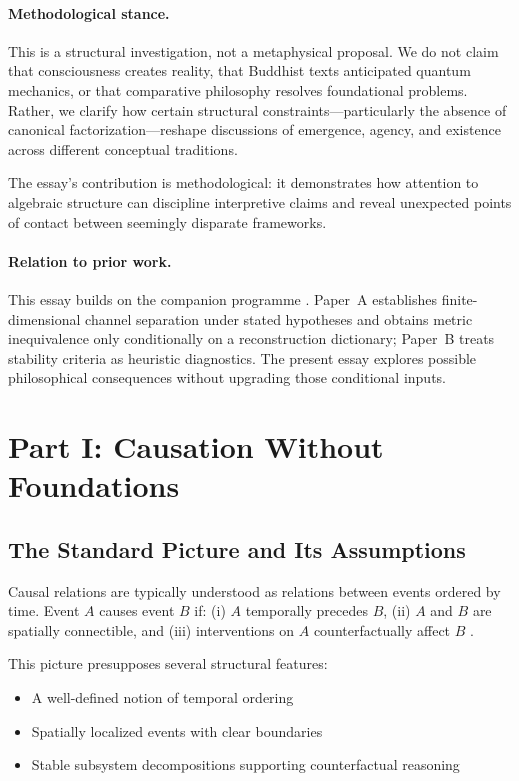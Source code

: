 \documentclass[12pt,a4paper,openany]{book}
\begin{document}
\paragraph{Methodological stance.}
This is a structural investigation, not a metaphysical proposal. We do not claim that consciousness creates reality, that Buddhist texts anticipated quantum mechanics, or that comparative philosophy resolves foundational problems. Rather, we clarify how certain structural constraints—particularly the absence of canonical factorization—reshape discussions of emergence, agency, and existence across different conceptual traditions.

The essay's contribution is methodological: it demonstrates how attention to algebraic structure can discipline interpretive claims and reveal unexpected points of contact between seemingly disparate frameworks.

\paragraph{Relation to prior work.}
This essay builds on the companion programme \cite{Liu2026PaperA,Liu2026PaperB}.  Paper~A establishes finite-dimensional channel separation under stated hypotheses and obtains metric inequivalence only conditionally on a reconstruction dictionary; Paper~B treats stability criteria as heuristic diagnostics.  The present essay explores possible philosophical consequences without upgrading those conditional inputs.

\section{Part I: Causation Without Foundations}
\label{H-C-sec:causation}

\subsection{The Standard Picture and Its Assumptions}
\label{H-C-sec:I.1}

Causal relations are typically understood as relations between events ordered by time. Event $A$ causes event $B$ if: (i) $A$ temporally precedes $B$, (ii) $A$ and $B$ are spatially connectible, and (iii) interventions on $A$ counterfactually affect $B$ \cite{Pearl2009}.

This picture presupposes several structural features:
\begin{itemize}
\item A well-defined notion of temporal ordering
\item Spatially localized events with clear boundaries
\item Stable subsystem decompositions supporting counterfactual reasoning
\end{itemize}
\end{document}
